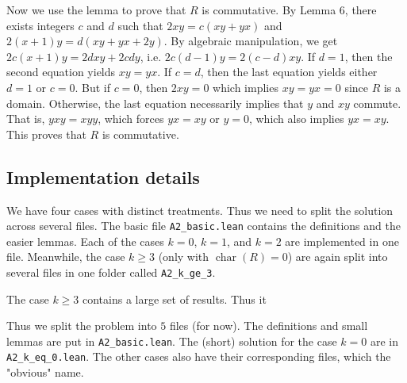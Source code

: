 \documentclass{article}
\DeclareMathOperator{\rchar}{char}
\begin{document}
Now we use the lemma to prove that $R$ is commutative.
By Lemma 6, there exists integers $c$ and $d$ such that $2xy = c(xy + yx)$ and $2(x + 1)y = d(xy + yx + 2y)$.
By algebraic manipulation, we get $2c(x + 1)y = 2dxy + 2cdy$, i.e. $2c(d - 1) y = 2(c - d) xy$.
If $d = 1$, then the second equation yields $xy = yx$.
If $c = d$, then the last equation yields either $d = 1$ or $c = 0$.
But if $c = 0$, then $2xy = 0$ which implies $xy = yx = 0$ since $R$ is a domain.
Otherwise, the last equation necessarily implies that $y$ and $xy$ commute.
That is, $yxy = xyy$, which forces $yx = xy$ or $y = 0$, which also implies $yx = xy$.
This proves that $R$ is commutative.



\subsection*{Implementation details}

We have four cases with distinct treatments.
Thus we need to split the solution across several files.
The basic file \texttt{A2\_basic.lean} contains the definitions and the easier lemmas.
Each of the cases $k = 0$, $k = 1$, and $k = 2$ are implemented in one file.
Meanwhile, the case $k \geq 3$ (only with $\rchar(R) = 0$) are again split into several files in one folder called \texttt{A2\_k\_ge\_3}.




The case $k \geq 3$ contains a large set of results.
Thus it 

Thus we split the problem into $5$ files (for now).
The definitions and small lemmas are put in \texttt{A2\_basic.lean}.
The (short) solution for the case $k = 0$ are in \texttt{A2\_k\_eq\_0.lean}.
The other cases also have their corresponding files, which the "obvious" name.
\end{document}
